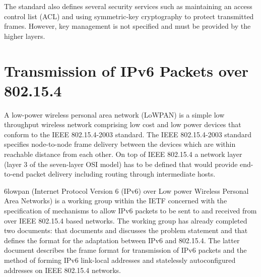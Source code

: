 \documentclass[12pt, titlepage, a4paper]{report}
\begin{document}
The standard also defines several security services such as maintaining an access control list (ACL) and
using symmetric-key cryptography to protect transmitted frames. However, key management is not specified and must be provided by the higher layers. 

\chapter{Transmission of IPv6 Packets over 802.15.4}\label{ch:6lowpan}
A low-power wireless personal area network (LoWPAN) is a simple low throughput wireless network comprising low cost and low power devices that conform to the IEEE 802.15.4-2003 standard. The IEEE 802.15.4-2003 standard specifies node-to-node frame delivery between the devices which are within reachable distance from each other. On top of IEEE 802.15.4 a network layer (layer 3 of the seven-layer OSI model) has to be defined that would provide end-to-end packet delivery including routing through intermediate hosts. 


6lowpan (Internet Protocol Version 6 (IPv6) over Low power Wireless Personal Area Networks) is a working group within the IETF concerned with the specification of mechanisms to allow IPv6 packets to be sent to and received from over IEEE 802.15.4 based networks. The working group has already completed two documents: \cite{rfc4919} that documents and discusses the problem statement and \cite{rfc4944} that defines the format for the adaptation between IPv6 and 802.15.4. The latter document describes the frame format for transmission of IPv6 packets and the method of forming IPv6 link-local addresses and statelessly autoconfigured addresses on IEEE 802.15.4 networks.

\end{document}
